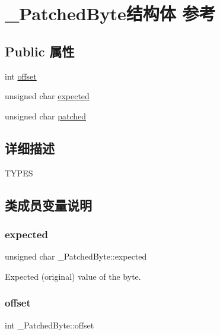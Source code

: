 \hypertarget{struct___patched_byte}{}\section{\+\_\+\+Patched\+Byte结构体 参考}
\label{struct___patched_byte}
\subsection*{Public 属性}
\begin{DoxyCompactItemize}
\item 
int \hyperlink{struct___patched_byte_ab2122f02014ef60aa8618aefa6f8a48c}{offset}
\item 
unsigned char \hyperlink{struct___patched_byte_aec296d565e1fe4a28aaffa9e24268450}{expected}
\item 
unsigned char \hyperlink{struct___patched_byte_adc73f6f9fcfde5c5b97b7ed43fdc13c0}{patched}
\end{DoxyCompactItemize}


\subsection{详细描述}
T\+Y\+P\+ES 

\subsection{类成员变量说明}
\mbox{\label{struct___patched_byte_aec296d565e1fe4a28aaffa9e24268450}} 
\subsubsection{\texorpdfstring{expected}{expected}}
{\footnotesize\ttfamily unsigned char \+\_\+\+Patched\+Byte\+::expected}

Expected (original) value of the byte. \mbox{\label{struct___patched_byte_ab2122f02014ef60aa8618aefa6f8a48c}} 
\subsubsection{\texorpdfstring{offset}{offset}}
{\footnotesize\ttfamily int \+\_\+\+Patched\+Byte\+::offset}

